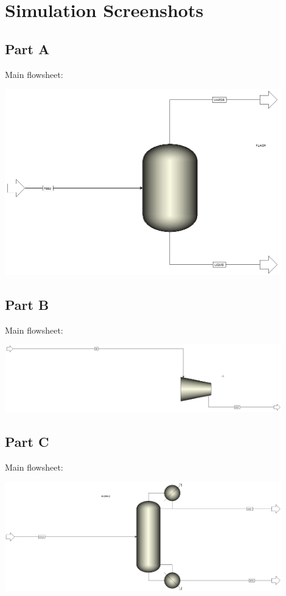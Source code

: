 \documentclass[12pt]{article}
\begin{document}
\section{Simulation Screenshots}

\subsection{Part A}

Main flowsheet:

\begin{center}
    \includegraphics[width=0.9\textwidth]{assets/flow2.png}
\end{center}

\subsection{Part B}

Main flowsheet:

\begin{center}
    \includegraphics[width=0.9\textwidth]{assets/flow1.png}
\end{center}

\subsection{Part C}

Main flowsheet:

\begin{center}
    \includegraphics[width=0.9\textwidth]{assets/flow3.png}
\end{center}
\end{document}
